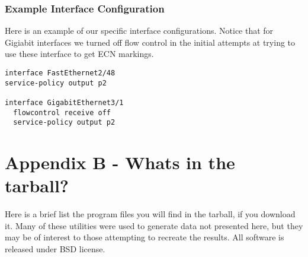\documentclass[12pt]{article}
\begin{document}
\subsubsection {Example Interface Configuration}

Here is an example of our specific interface configurations. Notice that 
for Gigiabit interfaces we turned off flow control in the initial attempts at
trying to use these interface to get ECN markings.
\begin{verbatim}
interface FastEthernet2/48
service-policy output p2

interface GigabitEthernet3/1
  flowcontrol receive off
  service-policy output p2
\end{verbatim}


\section*{Appendix B - Whats in the tarball?}
Here is a brief list the program files you will find in the tarball, if you download it. Many of
these utilities were used to generate data not presented here, but they may be of interest
to those attempting to recreate the results. All software is released under BSD license.
\end{document}

